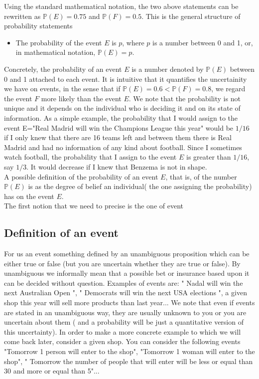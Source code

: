 \documentclass[12pt]{article}
\newcommand{\<}{{\langle \!\! \langle}}
\renewcommand{\>}{{\rangle \!\! \rangle}}
\begin{document}
Using the standard mathematical notation, the two above statements can be rewritten as $\mathbb{P}(E)=0.75$ and $ \mathbb{P}(F)=0.5$. This is the general structure of probability statements

\begin{itemize}
	\item The probability of the event $E$  is $p$, where $p$ is a number between 0 and 1, or, in mathematical notation, $\mathbb{P}(E)=p$.    
\end{itemize} 

Concretely, the probability of an event $E$ is a number denoted by $\mathbb{P}(E)$ between 0 and 1 attached to each event. It is intuitive that it quantifies the uncertainity we have on events, in the sense that if $\mathbb{P}(E)=0.6< \mathbb{P}(F)=0.8$, we regard the event $F$ more likely than the event $E$. We note that the probability is not unique and it depends on the individual who is deciding it  and on its state of information. As a simple example, the probability that I would assign to the event E="Real Madrid will win the Champions League this year" would be $1/16$ if I only knew that there are 16 teams left and between them there is Real Madrid and had no information of any kind about football. Since I sometimes watch football, the probability that I assign to the event $E$ is greater than $1/16$, say $1/3$. It would decrease if I knew that Benzema is not in shape.\\
A possible definition of the probability of an event $E$, that is, of the number $\mathbb{P}(E)$ is as the degree  of belief an individual( the one assigning the probability) has on the event $E$. \\
The first notion that we need to precise is the one of event


\subsection{Definition of an event}

For us an event something defined by an unambiguous proposition which can be either true or false (but you are uncertain whether they are true or false). By unambiguous we informally mean that a possible bet or insurance  based upon it can be decided without question. 
Examples of events are: " Nadal will win the next Australian Open ", " Democrats will win the next USA elections ", a given shop this year will sell more products than  last year... We note that even if events are stated in an unambiguous way, they are usually unknown to you or you are uncertain about them ( and a probability will be just a quantitative version of this uncertainty). 
In order to make a more concrete example to which we will come back later, consider a given shop. You can consider the following events "Tomorrow 1 person will enter to the shop", "Tomorrow 1 woman will enter to the shop", " Tomorrow the number of people that will enter will be less or equal than 30 and more or equal than 5"... 
\end{document}
